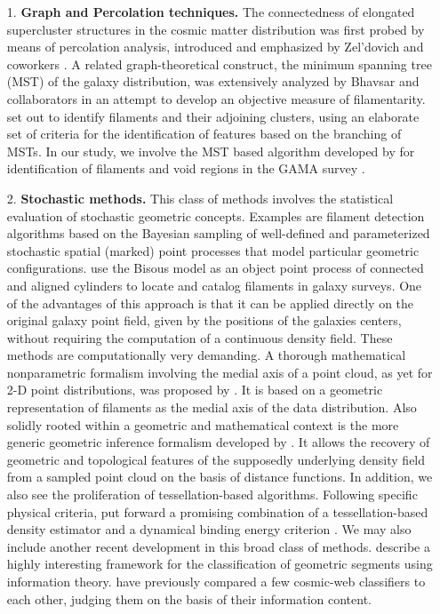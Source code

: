 \begin{itemize}
\item[1.] {\bf Graph and Percolation techniques.} The connectedness of elongated supercluster structures in the cosmic matter distribution 
was first probed by means of percolation analysis, introduced and emphasized by Zel'dovich and coworkers \citep{Zeldovich1982, Shandarin1983f, Shandarin1989,
Shandarin2004}. A related graph-theoretical construct, the minimum spanning tree (MST) of the galaxy distribution, was extensively 
analyzed by Bhavsar and collaborators \citep{Barrow1985, Colberg2007} in an attempt to develop an objective measure of filamentarity. 
\citet{Colberg2007} set out to identify filaments and their adjoining clusters, using an elaborate set of criteria for the identification of 
features based on the branching of MSTs. In our study, we involve the MST based algorithm developed by \cite{2014MNRAS.440L.106A} for identification 
of filaments and void regions in the GAMA survey \citep{Alpaslan2014}. 

\item[2.] {\bf Stochastic methods.} This class of methods involves the statistical evaluation of stochastic geometric concepts. Examples are 
 filament detection algorithms based on the Bayesian sampling of well-defined and parameterized stochastic spatial (marked) point 
processes that model particular geometric configurations. \cite{2010A&A...510A..38S} use the Bisous model as an object point process of connected and aligned cylinders to locate and catalog filaments in galaxy surveys. One of the advantages of this approach is that it can be applied directly on the original galaxy point field, given by the positions of the galaxies centers, without requiring the computation of a continuous density field. These 
methods are computationally very demanding. A thorough mathematical nonparametric formalism involving the medial axis of a point cloud, as yet 
for 2-D point distributions, was proposed by \cite{Genovese2010}. It is based on a geometric representation of filaments as the medial axis of 
the data distribution. Also solidly rooted within a geometric and mathematical context is the more generic geometric inference formalism 
developed by \cite{Chazal2009}. It allows the recovery of geometric and topological features of the supposedly underlying density field from a 
sampled point cloud on the basis of distance functions. In addition, we also see the proliferation of tessellation-based algorithms. Following 
specific physical criteria, \cite{Gonzalez2010} put forward a promising combination of a tessellation-based density estimator 
and a dynamical binding energy criterion \citep[also see][]{Weygaert2009}. We may also include another recent development in this broad 
class of methods. \cite{Leclercq2015,Leclercq2015c} describe a highly interesting framework for the classification of 
geometric segments using information theory. \cite{Leclercq2016} have  previously compared a few cosmic-web classifiers to each other, judging them on the basis of their information content.
\end{itemize}



